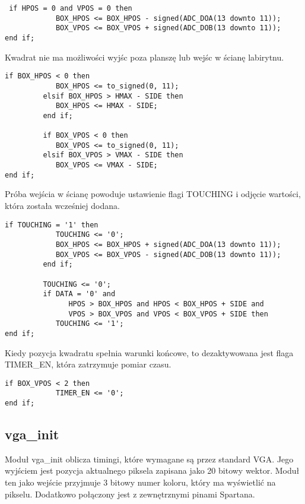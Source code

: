 \documentclass[11pt]{article}
\begin{document}
\begin{lstlisting}
 if HPOS = 0 and VPOS = 0 then
            BOX_HPOS <= BOX_HPOS - signed(ADC_DOA(13 downto 11));
            BOX_VPOS <= BOX_VPOS + signed(ADC_DOB(13 downto 11));
end if;
\end{lstlisting}


Kwadrat nie ma możliwości wyjśc poza planszę lub wejśc w ścianę labirytnu.

\begin{lstlisting}
if BOX_HPOS < 0 then
            BOX_HPOS <= to_signed(0, 11);
         elsif BOX_HPOS > HMAX - SIDE then
            BOX_HPOS <= HMAX - SIDE;
         end if;

         if BOX_VPOS < 0 then
            BOX_VPOS <= to_signed(0, 11);
         elsif BOX_VPOS > VMAX - SIDE then
            BOX_VPOS <= VMAX - SIDE;
end if;
\end{lstlisting}

Próba wejścia w ścianę powoduje ustawienie flagi TOUCHING i odjęcie wartości, która została wcześniej dodana.

\begin{lstlisting}
if TOUCHING = '1' then
            TOUCHING <= '0';
            BOX_HPOS <= BOX_HPOS + signed(ADC_DOA(13 downto 11));
            BOX_VPOS <= BOX_VPOS - signed(ADC_DOB(13 downto 11));
         end if;
         
         TOUCHING <= '0';
         if DATA = '0' and
               HPOS > BOX_HPOS and HPOS < BOX_HPOS + SIDE and 
               VPOS > BOX_VPOS and VPOS < BOX_VPOS + SIDE then
            TOUCHING <= '1';
end if;
\end{lstlisting}

Kiedy pozycja kwadratu spełnia warunki końcowe, to dezaktywowana jest flaga TIMER\_EN, która zatrzymuje pomiar czasu.

\begin{lstlisting}
if BOX_VPOS < 2 then
            TIMER_EN <= '0';
end if;
\end{lstlisting}



\subsection{vga\_init}

Moduł vga\_init oblicza timingi, które wymagane są przez standard VGA.
Jego wyjściem jest pozycja aktualnego piksela zapisana jako 20 bitowy wektor.
Moduł ten jako wejście przyjmuje 3 bitowy numer koloru, który ma wyświetlić na pikselu.
Dodatkowo połączony jest z zewnętrznymi pinami Spartana.
\end{document}
